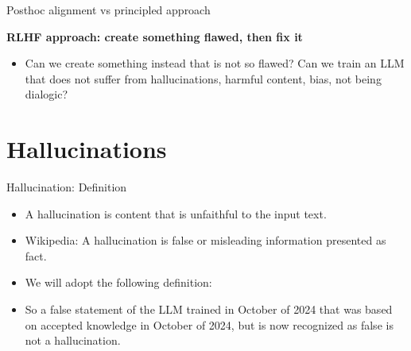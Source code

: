 \begin{vbframe}{Posthoc alignment vs principled approach}

\vfill

\textbf{RLHF approach: create something flawed, then fix it}

	\begin{itemize}
		\item \ques Can we create something instead that
		is not so flawed?
                Can we train an LLM that does not
		suffer from hallucinations, harmful content,
		bias, not being dialogic?
	\end{itemize}

\vfill

\end{vbframe}










\section{Hallucinations}

\begin{vbframe}{Hallucination: Definition}

\vfill


	\begin{itemize}
		\item
A hallucination is content that is unfaithful to the input text.
\href{https://aclanthology.org/2020.acl-main.173.pdf}{}
		\item
Wikipedia: A hallucination is false or misleading
		information presented as fact.
		\item
                We will adopt the following definition:
                \item So a false statement of the LLM
                trained in October of 2024 that
                was based on accepted knowledge in October
                of 2024, but is now recognized as false is not
                a hallucination.
	\end{itemize}

\vfill

\end{vbframe}

